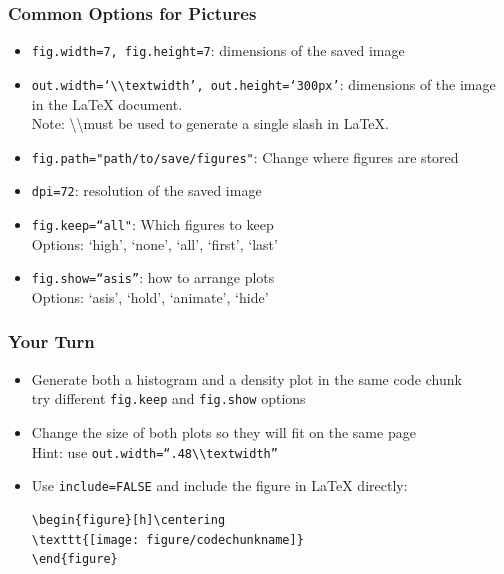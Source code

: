\documentclass{beamer}\usepackage[]{graphicx}\usepackage[]{color}
\begin{document}
\begin{frame}
\frametitle{Common Options for Pictures}
\begin{itemize}
\item \texttt{fig.width=7, fig.height=7}: dimensions of the saved image
\item \texttt{out.width=`\textbackslash\textbackslash textwidth', out.height=`300px'}: dimensions of the image in the LaTeX document. \\ Note: \textbackslash\textbackslash must be used to generate a single slash in LaTeX. \bigskip

\item \texttt{fig.path="path/to/save/figures"}: Change where figures are stored
\item \texttt{dpi=72}: resolution of the saved image\bigskip

\item \texttt{fig.keep=``all"}: Which figures to keep\\
Options: `high', `none', `all', `first', `last'
\item \texttt{fig.show=``asis''}: how to arrange plots\\
Options: `asis', `hold', `animate', `hide'\bigskip
\end{itemize}
\end{frame}


\begin{frame}[fragile]
\frametitle{Your Turn}
\begin{itemize}
\item Generate both a histogram and a density plot in the same code chunk\\
try different \texttt{fig.keep} and \texttt{fig.show} options
\item Change the size of both plots so they will fit on the same page\\
Hint: use \texttt{out.width=``.48\textbackslash\textbackslash textwidth''}
\item Use \texttt{include=FALSE} and include the figure in LaTeX directly:\\
\begin{verbatim}
\begin{figure}[h]\centering
\texttt{[image: figure/codechunkname]}
\end{figure}
\end{verbatim}
\end{itemize}
\end{frame}
\end{document}
